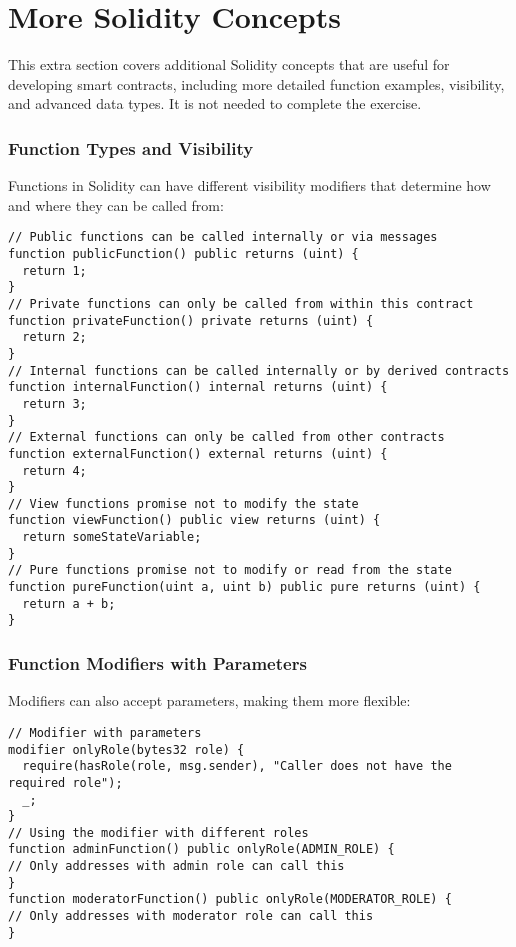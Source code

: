 \documentclass[12pt]{article}
\begin{document}
\section{More Solidity Concepts}

\noindent
\begin{minipage}[c]{\textwidth}
This extra section covers additional Solidity concepts that are useful for developing smart contracts, including more detailed function examples, visibility, and advanced data types. It is not needed to complete the exercise.

\subsubsection*{Function Types and Visibility}
Functions in Solidity can have different visibility modifiers that determine how and where they can be called from:

\begin{lstlisting}[language=Solidity]
// Public functions can be called internally or via messages
function publicFunction() public returns (uint) {
  return 1;
}
// Private functions can only be called from within this contract
function privateFunction() private returns (uint) {
  return 2;
}
// Internal functions can be called internally or by derived contracts
function internalFunction() internal returns (uint) {
  return 3;
}
// External functions can only be called from other contracts
function externalFunction() external returns (uint) {
  return 4;
}
// View functions promise not to modify the state
function viewFunction() public view returns (uint) {
  return someStateVariable;
}
// Pure functions promise not to modify or read from the state
function pureFunction(uint a, uint b) public pure returns (uint) {
  return a + b;
}
\end{lstlisting}
\end{minipage}

\subsubsection*{Function Modifiers with Parameters}

Modifiers can also accept parameters, making them more flexible:

\noindent
\begin{minipage}[c]{\textwidth}
\begin{lstlisting}[language=Solidity]
// Modifier with parameters
modifier onlyRole(bytes32 role) {
  require(hasRole(role, msg.sender), "Caller does not have the required role");
  _;
}
// Using the modifier with different roles
function adminFunction() public onlyRole(ADMIN_ROLE) {
// Only addresses with admin role can call this
}
function moderatorFunction() public onlyRole(MODERATOR_ROLE) {
// Only addresses with moderator role can call this
}
\end{lstlisting}
\end{minipage}
\end{document}
